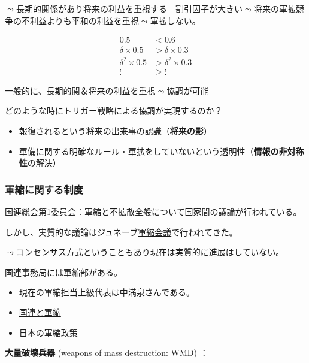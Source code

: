 \documentclass[
  xelatex,
  ja=standard]{bxjsarticle}
\providecommand{\tightlist}{%
  \setlength{\itemsep}{0pt}\setlength{\parskip}{0pt}}\usepackage{longtable,booktabs,array}
\begin{document}
\(\leadsto\)長期的関係があり将来の利益を重視する＝割引因子が大きい\(\leadsto\)将来の軍拡競争の不利益よりも平和の利益を重視\(\leadsto\)軍拡しない。

\[
\begin{split}
0.5 &< 0.6 \\
\delta \times 0.5 &> \delta \times 0.3 \\
\delta^2 \times 0.5 &> \delta^2 \times 0.3 \\
\vdots &> \vdots 
\end{split}
\]

一般的に、長期的関＆将来の利益を重視\(\leadsto\)協調が可能

どのような時にトリガー戦略による協調が実現するのか？

\begin{itemize}
\tightlist
\item
  報復されるという将来の出来事の認識（\textbf{将来の影}）
\item
  軍備に関する明確なルール・軍拡をしていないという透明性（\textbf{情報の非対称性}の解決）
\end{itemize}

\hypertarget{ux8ecdux7e2eux306bux95a2ux3059ux308bux5236ux5ea6}{%
\subsubsection{軍縮に関する制度}\label{ux8ecdux7e2eux306bux95a2ux3059ux308bux5236ux5ea6}}

\href{https://www.un.org/en/ga/first/index.shtml}{国連総会第1委員会}：軍縮と不拡散全般について国家間の議論が行われている。

しかし、実質的な議論はジュネーブ\href{https://www.mofa.go.jp/mofaj/gaiko/un_cd/cd/gaiyo.html}{軍縮会議}で行われてきた。

\(\leadsto\)コンセンサス方式ということもあり現在は実質的に進展はしていない。

国連事務局には軍縮部がある。

\begin{itemize}
\tightlist
\item
  現在の軍縮担当上級代表は中満泉さんである。
\item
  \href{https://www.unic.or.jp/activities/peace_security/disarmament/un_disarmament/}{国連と軍縮}
\item
  \href{https://www.mofa.go.jp/mofaj/gaiko/hosho.html}{日本の軍縮政策}
\end{itemize}

\textbf{大量破壊兵器} (weapons of mass destruction: WMD) ：
\end{document}
